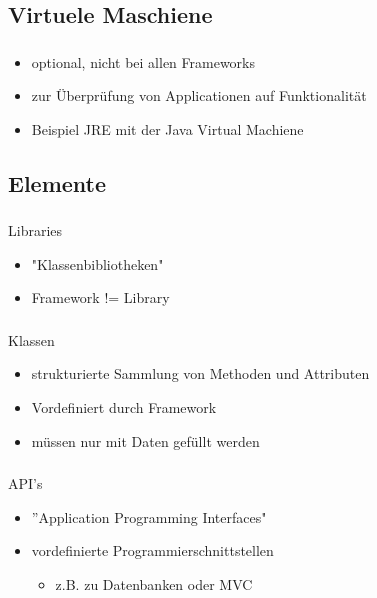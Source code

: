 \documentclass[aspectratio=169,14pt,xcolor=dvipsnames]{beamer}
\begin{document}
\subsection{Virtuele Maschiene}
\begin{frame}[t]
    \frametitle{\subsecname}
    \framesubtitle{\secname}
    \begin{itemize}
        \setlength{\itemsep}{1.5em}
        \item optional, nicht bei allen Frameworks
        \item zur Überprüfung von Applicationen auf Funktionalität
        \item Beispiel JRE mit der Java Virtual Machiene
    \end{itemize}
\end{frame}

\subsection{Elemente}
\begin{frame}[t]
    \frametitle{\subsecname}
    \framesubtitle{\secname}
    Libraries
    \begin{itemize}
        \setlength{\itemsep}{1.5em}
        \item "Klassenbibliotheken"
        \item Framework != Library
    \end{itemize}
\end{frame}

\begin{frame}[t]
    \frametitle{\subsecname}
    \framesubtitle{\secname}
    Klassen
    \begin{itemize}
        \setlength{\itemsep}{1.5em}
        \item strukturierte Sammlung von Methoden und Attributen
        \item Vordefiniert durch Framework
        \item müssen nur mit Daten gefüllt werden
    \end{itemize}
\end{frame}

\begin{frame}[t]
    \frametitle{\subsecname}
    \framesubtitle{\secname}
    API's
    \begin{itemize}
        \setlength{\itemsep}{1.5em}
        \item ''Application Programming Interfaces"
        \item vordefinierte Programmierschnittstellen
        \begin{itemize}
            \item z.B. zu Datenbanken oder MVC
        \end{itemize}
    \end{itemize}
\end{frame}
\end{document}
